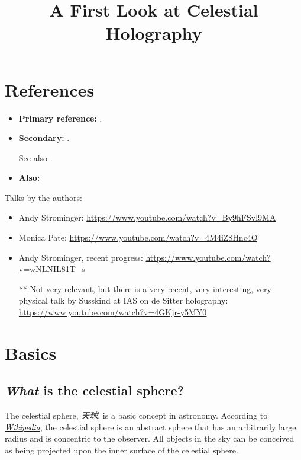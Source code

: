 \documentclass[a4paper
	,10pt
]{article}
\title{A First Look at Celestial Holography}
\begin{document}
\maketitle
{}
\thispagestyle{empty}


\setlength{\parskip}{.1\baselineskip}
\tableofcontents
\setlength{\parskip}{\parskipnorm}

\addtocounter{section}{-1}
\section{References}
	\begin{itemize}
	\item \textbf{Primary reference:} . 
	\item \textbf{Secondary:} . 
	
	See also . 
	\item \textbf{Also:} 
	\end{itemize}
	
	\noindent
	Talks by the authors:
	\begin{itemize}[noitemsep]
	\item Andy Strominger: \url{https://www.youtube.com/watch?v=By9hFSvl9MA}
	\item Monica Pate: \url{https://www.youtube.com/watch?v=4M4iZ8Hnc4Q}
	\item Andy Strominger, recent progress: \url{https://www.youtube.com/watch?v=wNLNIL81T_s}
	
	\vspace{.5\baselineskip}
	
	\item[**] Not very relevant, but there is a very recent, very interesting, very physical talk by Susskind at IAS on de Sitter holography: \url{https://www.youtube.com/watch?v=4GKjr-y5MY0}
	\end{itemize}

\pagebreak

\section{Basics}
\subsection{\textsl{What} is the celestial sphere?}
	The celestial sphere, \textit{天球}, is a basic concept in astronomy. According to \href{https://en.wikipedia.org/wiki/Celestial_sphere}{\textsl{Wikipedia}}, the celestial sphere is an abstract sphere that has an arbitrarily large radius and is concentric to the observer. All objects in the sky can be conceived as being projected upon the inner surface of the celestial sphere. 
	
\end{document}
